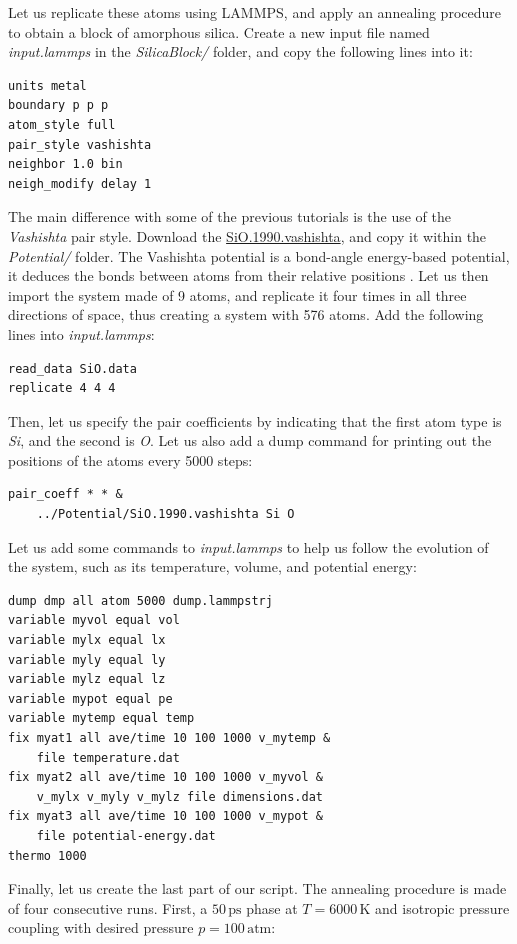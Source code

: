 \documentclass[9pt,tutorial]{livecoms}
\begin{document}
Let us replicate these atoms using LAMMPS, and apply an annealing procedure to obtain a block of amorphous silica. Create a new input file named \textit{input.lammps} in the \textit{SilicaBlock/} folder, and copy
the following lines into it:
{\normalsize \begin{verbatim}
units metal
boundary p p p
atom_style full
pair_style vashishta
neighbor 1.0 bin
neigh_modify delay 1
\end{verbatim}}
The main difference with some of the previous tutorials is the use of the \textit{Vashishta} pair style. Download the \href{https://raw.githubusercontent.com/lammpstutorials/lammpstutorials-article/main/files/tutorial6/SiO.1990.vashishta}{SiO.1990.vashishta}, and copy it within the \textit{Potential/} folder. The Vashishta potential is a bond-angle energy-based potential, it deduces the bonds between atoms from their relative positions \cite{vashishta1990interaction}. Let us then import the system made of 9 atoms, and replicate it four times in all three
directions of space, thus creating a system with 576 atoms. Add the following lines into \textit{input.lammps}:
{\normalsize \begin{verbatim}
read_data SiO.data
replicate 4 4 4
\end{verbatim}}
Then, let us specify the pair coefficients by indicating that the first atom type is \textit{Si}, and
the second is \textit{O}. Let us also add a dump command for printing out the positions of the atoms every 5000 steps:
{\normalsize \begin{verbatim}
pair_coeff * * &
    ../Potential/SiO.1990.vashishta Si O
\end{verbatim}}
\noindent Let us add some commands to \textit{input.lammps} to help us follow the evolution of the system, such as its temperature, volume, and potential energy:
{\normalsize \begin{verbatim}
dump dmp all atom 5000 dump.lammpstrj
variable myvol equal vol
variable mylx equal lx
variable myly equal ly
variable mylz equal lz
variable mypot equal pe
variable mytemp equal temp
fix myat1 all ave/time 10 100 1000 v_mytemp &
    file temperature.dat
fix myat2 all ave/time 10 100 1000 v_myvol &
    v_mylx v_myly v_mylz file dimensions.dat
fix myat3 all ave/time 10 100 1000 v_mypot &
    file potential-energy.dat
thermo 1000
\end{verbatim}}
Finally, let us create the last part of our script. The annealing procedure is made of four consecutive runs. First, a $50\,\text{ps}$ phase at $T = 6000\,\text{K}$ and isotropic pressure coupling with desired pressure $p = 100\,\text{atm}$:
\end{document}
